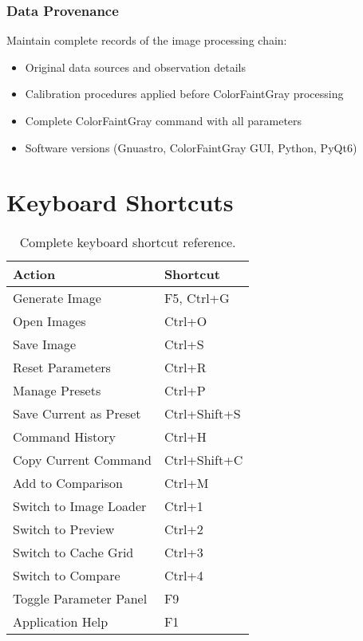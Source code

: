 \documentclass[11pt,a4paper]{article}
\begin{document}
\subsubsection{Data Provenance}

Maintain complete records of the image processing chain:

\begin{itemize}[leftmargin=*]
\item Original data sources and observation details
\item Calibration procedures applied before ColorFaintGray processing
\item Complete ColorFaintGray command with all parameters
\item Software versions (Gnuastro, ColorFaintGray GUI, Python, PyQt6)
\end{itemize}

\section{Keyboard Shortcuts}

\begin{table}[H]
\centering
\begin{tabular}{@{}ll@{}}
\toprule
Action & Shortcut \\
\midrule
Generate Image & F5, Ctrl+G \\
Open Images & Ctrl+O \\
Save Image & Ctrl+S \\
Reset Parameters & Ctrl+R \\
Manage Presets & Ctrl+P \\
Save Current as Preset & Ctrl+Shift+S \\
Command History & Ctrl+H \\
Copy Current Command & Ctrl+Shift+C \\
Add to Comparison & Ctrl+M \\
Switch to Image Loader & Ctrl+1 \\
Switch to Preview & Ctrl+2 \\
Switch to Cache Grid & Ctrl+3 \\
Switch to Compare & Ctrl+4 \\
Toggle Parameter Panel & F9 \\
Application Help & F1 \\
\bottomrule
\end{tabular}
\caption{Complete keyboard shortcut reference.}
\label{tab:shortcuts}
\end{table}
\end{document}

